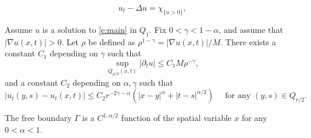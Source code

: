 \documentclass[10pt,a4paper]{amsart}
\begin{document}
 \begin{equation} \label{e:main}
     u_t - \Delta u = \chi_{\{u>0\}}, 
 \end{equation}

\begin{corollary} \label{c:rescale}
 Assume $u$ is a solution to \eqref{e:main} in $Q_1$. Fix $0<\gamma<1-\alpha$, and assume that $|\nabla u(x,t)|>0$. Let $\rho$ be defined as $\rho^{1-\gamma}=|\nabla u(x,t)|/M$. There exists a constant $C_1$ depending on $\gamma$ such that 
 \begin{equation} \label{e:rho}
 \sup_{Q_{\rho/2}(x,t)} |\partial_t u| \leq C_1 M\rho^{-\gamma},
 \end{equation}
 and a constant $C_2$ depending on $\alpha,\gamma$ such that  
 \begin{equation} \label{e:rho2}
  | u_t(y,s)-u_t(x,t)| \leq C_2 r^{-2\gamma-\alpha} (|x-y|^{\alpha}+|t-s|^{\alpha/2}) \quad \text{ for any } (y,s) \in Q_{r/2}. 
 \end{equation}
\end{corollary}

\begin{theorem} \label{t:holder}
    The free boundary $\Gamma$ is a $C^{1,\alpha/2}$ function of the spatial variable $x$ for any $0<\alpha<1$. 
\end{theorem}
\end{document}
